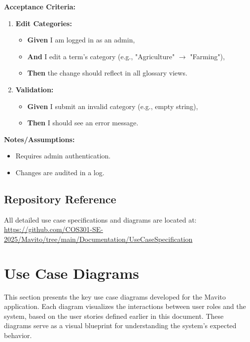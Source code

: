 \documentclass[12pt]{article}
\begin{document}
\vspace{1em}
\textbf{Acceptance Criteria:}
\begin{enumerate}
    \item \textbf{Edit Categories:}
    \begin{itemize}
        \item \textbf{Given} I am logged in as an admin,
        \item \textbf{And} I edit a term's category (e.g., "Agriculture" $\rightarrow$ "Farming"),
        \item \textbf{Then} the change should reflect in all glossary views.
    \end{itemize}

    \item \textbf{Validation:}
    \begin{itemize}
        \item \textbf{Given} I submit an invalid category (e.g., empty string),
        \item \textbf{Then} I should see an error message.
    \end{itemize}
\end{enumerate}

\vspace{1em}
\textbf{Notes/Assumptions:}
\begin{itemize}
    \item Requires admin authentication.
    \item Changes are audited in a log.
\end{itemize}

\subsection{Repository Reference}
All detailed use case specifications and diagrams are located at:  
\newline
\url{https://github.com/COS301-SE-2025/Mavito/tree/main/Documentation/UseCaseSpecification}

\section{Use Case Diagrams}

This section presents the key use case diagrams developed for the Mavito application. Each diagram visualizes the interactions between user roles and the system, based on the user stories defined earlier in this document. These diagrams serve as a visual blueprint for understanding the system's expected behavior.
\end{document}
